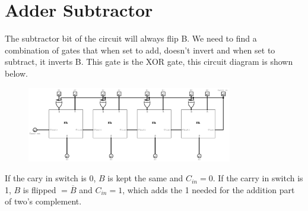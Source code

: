 \section*{Adder Subtractor}
The subtractor bit of the circuit will always flip B. We need to find a combination of gates that when set to add, doesn't invert and when set to subtract, it inverts B.  This gate is the XOR gate, this circuit diagram is shown below.
\begin{figure}[H]
    \centering
    \includegraphics[width=0.8\textwidth]{assets/add-subt.png}
\end{figure}

If the cary in switch is 0, $B$ is kept the same and $C_{in}=0$. If the carry in switch is 1, $B$ is flipped $=\overline{B}$ and $C_{in} = 1$, which adds the 1 needed for the addition part of two's complement.